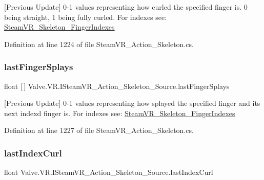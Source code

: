 \mbox{[}Previous Update\mbox{]} 0-\/1 values representing how curled the specified finger is. 0 being straight, 1 being fully curled. For indexes see\+: \mbox{\hyperlink{class_valve_1_1_v_r_1_1_steam_v_r___skeleton___finger_indexes}{Steam\+V\+R\+\_\+\+Skeleton\+\_\+\+Finger\+Indexes}} 



Definition at line 1224 of file Steam\+V\+R\+\_\+\+Action\+\_\+\+Skeleton.\+cs.

\mbox{\label{interface_valve_1_1_v_r_1_1_i_steam_v_r___action___skeleton___source_ad38ea0c71b903fbc01e86f51aef95b94}} 
\subsubsection{\texorpdfstring{lastFingerSplays}{lastFingerSplays}}
{\footnotesize\ttfamily float \mbox{[}$\,$\mbox{]} Valve.\+V\+R.\+I\+Steam\+V\+R\+\_\+\+Action\+\_\+\+Skeleton\+\_\+\+Source.\+last\+Finger\+Splays\hspace{0.3cm}{\ttfamily [get]}}



\mbox{[}Previous Update\mbox{]} 0-\/1 values representing how splayed the specified finger and it\textquotesingle{}s next index\textquotesingle{}d finger is. For indexes see\+: \mbox{\hyperlink{class_valve_1_1_v_r_1_1_steam_v_r___skeleton___finger_indexes}{Steam\+V\+R\+\_\+\+Skeleton\+\_\+\+Finger\+Indexes}} 



Definition at line 1227 of file Steam\+V\+R\+\_\+\+Action\+\_\+\+Skeleton.\+cs.

\mbox{\label{interface_valve_1_1_v_r_1_1_i_steam_v_r___action___skeleton___source_a7d769bb760cebc4687b5768b1348dfee}} 
\subsubsection{\texorpdfstring{lastIndexCurl}{lastIndexCurl}}
{\footnotesize\ttfamily float Valve.\+V\+R.\+I\+Steam\+V\+R\+\_\+\+Action\+\_\+\+Skeleton\+\_\+\+Source.\+last\+Index\+Curl\hspace{0.3cm}{\ttfamily [get]}}



